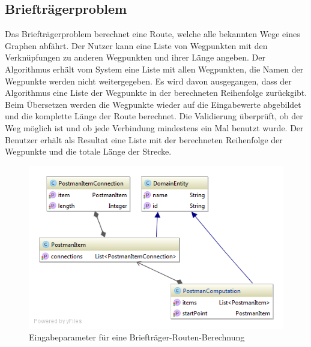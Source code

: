 %
%
%
%

\subsection{Briefträgerproblem}
Das Briefträgerproblem berechnet eine Route, welche alle bekannten Wege eines Graphen abfährt. Der Nutzer kann eine Liste von Wegpunkten mit den Verknüpfungen zu anderen 
Wegpunkten und ihrer Länge angeben. Der Algorithmus erhält vom System eine Liste mit allen Wegpunkten, die Namen der Wegpunkte werden nicht weitergegeben. Es wird davon ausgegangen, 
dass der Algorithmus eine Liste der Wegpunkte in der berechneten Reihenfolge zurückgibt. Beim Übersetzen werden die Wegpunkte wieder auf die Eingabewerte abgebildet und die komplette 
Länge der Route berechnet. Die Validierung überprüft, ob der Weg möglich ist und ob jede Verbindung mindestens ein Mal benutzt wurde. Der Benutzer erhält als Resultat eine Liste mit der berechneten 
Reihenfolge der Wegpunkte und die totale Länge der Strecke.

\begin{figure}[h]
\centering
\includegraphics[scale=0.5]{images/probleme/postman.png}
\caption[Eingabeparameter für eine Briefträger-Routen-Berechnung]{Eingabeparameter für eine Briefträger-Routen-Berechnung \selfmade{}}
\label{fig:postman_input}
\end{figure}

\FloatBarrier
%
%
%
%

